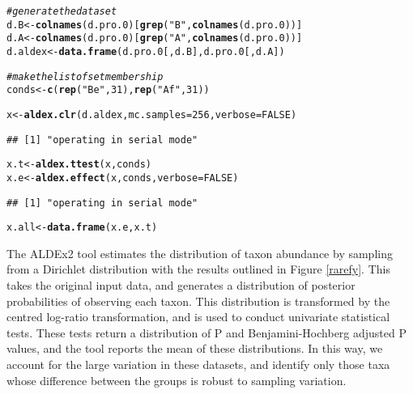 \documentclass[11pt]{article}\usepackage[]{graphicx}\usepackage[]{color}
\makeatletter
\newcommand{\hlnum}[1]{\textcolor[rgb]{0.686,0.059,0.569}{#1}}%
\newcommand{\hlstr}[1]{\textcolor[rgb]{0.192,0.494,0.8}{#1}}%
\newcommand{\hlcom}[1]{\textcolor[rgb]{0.678,0.584,0.686}{\textit{#1}}}%
\newcommand{\hlstd}[1]{\textcolor[rgb]{0.345,0.345,0.345}{#1}}%
\newcommand{\hlkwb}[1]{\textcolor[rgb]{0.69,0.353,0.396}{#1}}%
\newcommand{\hlkwc}[1]{\textcolor[rgb]{0.333,0.667,0.333}{#1}}%
\newcommand{\hlkwd}[1]{\textcolor[rgb]{0.737,0.353,0.396}{\textbf{#1}}}%
\newenvironment{kframe}{%
 \def\at@end@of@kframe{}%
 \ifinner\ifhmode%
  \def\at@end@of@kframe{\end{minipage}}%
  \begin{minipage}{\columnwidth}%
 \fi\fi%
 \def\FrameCommand##1{\hskip\@totalleftmargin \hskip-\fboxsep
 \colorbox{shadecolor}{##1}\hskip-\fboxsep
     \hskip-\linewidth \hskip-\@totalleftmargin \hskip\columnwidth}%
 \MakeFramed {\advance\hsize-\width
   \@totalleftmargin\z@ \linewidth\hsize
   \@setminipage}}%
 {\par\unskip\endMakeFramed%
 \at@end@of@kframe}
\newenvironment{knitrout}{}{} %
\makeatother
\begin{document}
\begin{knitrout}
\color{fgcolor}\begin{kframe}
\begin{alltt}
\hlcom{# generate the dataset }
\hlstd{d.B} \hlkwb{<-} \hlkwd{colnames}\hlstd{(d.pro.0)[}\hlkwd{grep}\hlstd{(}\hlstr{"B"}\hlstd{,} \hlkwd{colnames}\hlstd{(d.pro.0))]}
\hlstd{d.A} \hlkwb{<-} \hlkwd{colnames}\hlstd{(d.pro.0)[}\hlkwd{grep}\hlstd{(}\hlstr{"A"}\hlstd{,} \hlkwd{colnames}\hlstd{(d.pro.0))]}
\hlstd{d.aldex} \hlkwb{<-} \hlkwd{data.frame}\hlstd{(d.pro.0[,d.B], d.pro.0[,d.A])}

\hlcom{# make the list of set membership}
\hlstd{conds} \hlkwb{<-} \hlkwd{c}\hlstd{(}\hlkwd{rep}\hlstd{(}\hlstr{"Be"}\hlstd{,} \hlnum{31}\hlstd{),} \hlkwd{rep}\hlstd{(}\hlstr{"Af"}\hlstd{,} \hlnum{31}\hlstd{))}

\hlstd{x} \hlkwb{<-} \hlkwd{aldex.clr}\hlstd{(d.aldex,} \hlkwc{mc.samples}\hlstd{=}\hlnum{256}\hlstd{,} \hlkwc{verbose}\hlstd{=}\hlnum{FALSE}\hlstd{)}
\end{alltt}
\begin{verbatim}
## [1] "operating in serial mode"
\end{verbatim}
\begin{alltt}
\hlstd{x.t} \hlkwb{<-} \hlkwd{aldex.ttest}\hlstd{(x, conds)}
\hlstd{x.e} \hlkwb{<-} \hlkwd{aldex.effect}\hlstd{(x, conds,} \hlkwc{verbose}\hlstd{=}\hlnum{FALSE}\hlstd{)}
\end{alltt}
\begin{verbatim}
## [1] "operating in serial mode"
\end{verbatim}
\begin{alltt}
\hlstd{x.all} \hlkwb{<-} \hlkwd{data.frame}\hlstd{(x.e,x.t)}
\end{alltt}
\end{kframe}
\end{knitrout}

The ALDEx2 tool estimates the distribution of taxon abundance by sampling from a Dirichlet distribution with the results outlined in Figure \ref{rarefy}. This takes the original input data, and generates a distribution of posterior probabilities of observing each taxon. This distribution is transformed by the centred log-ratio transformation, and is used to conduct univariate statistical tests. These tests return a distribution of P and Benjamini-Hochberg adjusted P values, and the tool reports the mean of these distributions. In this way, we account for the large variation in these datasets, and identify only those taxa whose difference between the groups is robust to sampling variation.   
\end{document}

